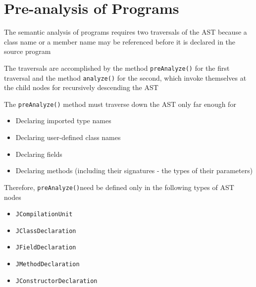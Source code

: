\documentclass[8pt,a4paper,compress]{beamer}
\begin{document}
\section{Pre-analysis of \protect\jmm Programs}
\begin{frame}[fragile]
\pause

The semantic analysis of \jmm  programs requires two traversals of the AST because a class name or a member name may be referenced before it is declared in the source program

\pause
\bigskip

The traversals are accomplished by the method \lstinline{preAnalyze()} for the first traversal and the method \lstinline{analyze()} for the second, which invoke themselves at the child nodes for recursively descending the AST

\pause
\bigskip

The \lstinline{preAnalyze()} method must traverse down the AST only far enough for
\begin{itemize}
\item Declaring imported type names
\item Declaring user-defined class names
\item Declaring fields
\item Declaring methods (including their signatures - the types of their parameters)
\end{itemize}

\pause
\bigskip

Therefore, \lstinline{preAnalyze()}need be defined only in the following types of AST nodes
\begin{itemize}
\item \lstinline{JCompilationUnit}
\item \lstinline{JClassDeclaration}
\item \lstinline{JFieldDeclaration}
\item \lstinline{JMethodDeclaration}
\item \lstinline{JConstructorDeclaration}
\end{itemize}
\end{frame}
\end{document}

